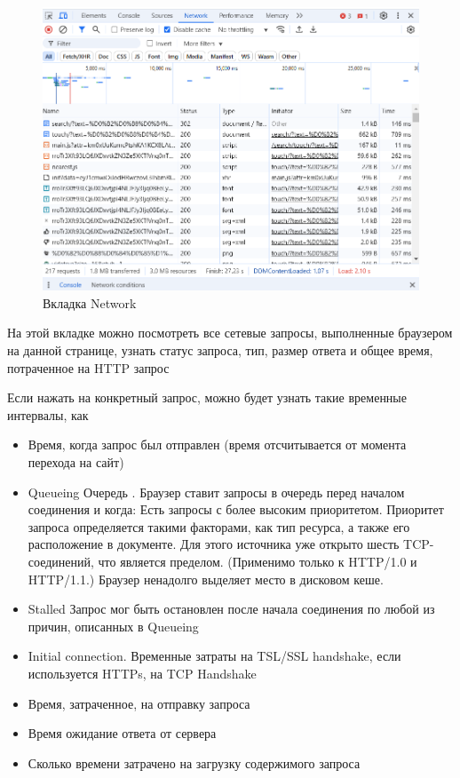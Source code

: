 \documentclass[12pt]{article}
\begin{document}
\begin{figure}[H]
    \centering
    \includegraphics[width=1\textwidth]{../images/network.png}
    \caption{Вкладка Network}
\end{figure}

На этой вкладке можно посмотреть все сетевые запросы, выполненные браузером на данной странице,
узнать статус запроса, тип, размер ответа и общее время, потраченное на HTTP запрос

Если нажать на конкретный запрос, можно будет узнать такие временные интервалы, как

\begin{itemize}[label=-]
    \item Время, когда запрос был отправлен (время отсчитывается от момента перехода на сайт)
    \item Queueing Очередь . Браузер ставит запросы в очередь перед началом соединения и когда:
          Есть запросы с более высоким приоритетом. Приоритет запроса определяется такими факторами, как тип ресурса, а также его расположение в документе.
          Для этого источника уже открыто шесть TCP-соединений, что является пределом. (Применимо только к HTTP/1.0 и HTTP/1.1.)
          Браузер ненадолго выделяет место в дисковом кеше.
    \item Stalled Запрос мог быть остановлен после начала соединения по любой из причин, описанных в Queueing
    \item Initial connection. Временные затраты на TSL/SSL handshake, если используется HTTPs, на TCP Handshake
    \item Время, затраченное, на отправку запроса
    \item Время ожидание ответа от сервера
    \item Сколько времени затрачено на загрузку содержимого запроса
\end{itemize}
\end{document}
